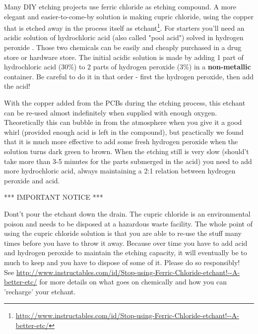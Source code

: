 \documentclass{article}
\begin{document}
Many DIY etching projects use ferric chloride as etching compound. A more elegant and easier-to-come-by solution is making cupric chloride, using the copper that is etched away in the process itself as etchant\footnote{\url{http://www.instructables.com/id/Stop-using-Ferric-Chloride-etchant!--A-better-etc/}}. For starters you'll need an acidic solution of hydrochloric acid (also called "pool acid") solved in hydrogen peroxide . Those two chemicals can be easily and cheaply purchased in a drug store or hardware store. The initial acidic solution is made by adding 1 part of hydrochloric acid (30\%) to 2 parts of hydrogen peroxide (3\%) in a \textbf {non-metallic} container. Be careful to do it in that order - first the hydrogen peroxide, then add the acid!

With the copper added from the PCBs during the etching process, this etchant can be re-used almost indefinitely when supplied with enough oxygen. Theoretically this can bubble in from the atmosphere when you give it a good whirl (provided enough acid is left in the compound), but practically we found that it is much more effective to add some fresh hydrogen peroxide when the solution turns dark green to brown. When the etching still is very slow (should't take more than 3-5 minutes for the parts submerged in the acid) you need to add more hydrochloric acid, always maintaining a 2:1 relation between hydrogen peroxide and acid.
\\
\begin {center}
*** IMPORTANT NOTICE ***
\end {center}
Dont't pour the etchant down the drain. The cupric chloride is an environmental poison and needs to be disposed at a hazardous waste facility. The whole point of using the cupric chloride solution is that you are able to re-use the stuff many times before you have to throw it away. Because over time you have to add acid and hydrogen peroxide to maintain the etching capacity, it will eventually be to much to keep and you have to dispose of some of it. Please do so responsibly!
\\See \url{http://www.instructables.com/id/Stop-using-Ferric-Chloride-etchant!--A-better-etc/} for more details on what goes on chemically and how you can 'recharge' your etchant.
\end{document}
